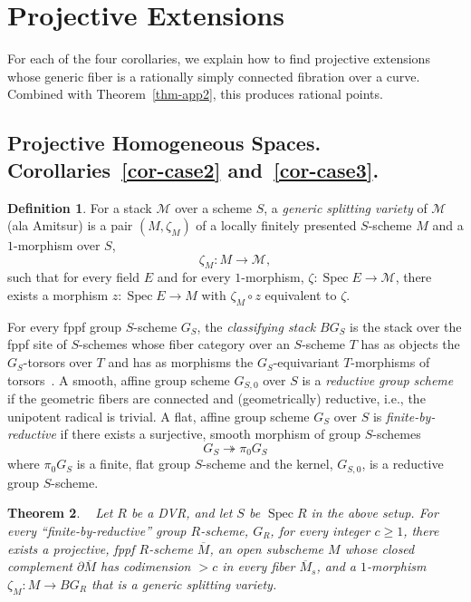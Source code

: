 \documentclass[11pt]{article}
\newtheorem{theo}{Theorem}[section]
\theoremstyle{definition}
\newtheorem{defi}[theo]{Definition}
\numberwithin{equation}{section}
\numberwithin{figure}{section}
\numberwithin{table}{section}
\newcommand{\mc}{\mathcal}
\newcommand{\mcM}{\mc{M}}
\newcommand{\ol}{\overline}
\DeclareMathOperator{\SP}{Spec}
\begin{document}
\section{Projective Extensions} \label{sec-extend}

For each of the four corollaries, we explain how to find projective extensions whose generic fiber is a rationally simply connected fibration over a curve. Combined with Theorem~\ref{thm-app2}, this produces rational points.



\subsection{Projective Homogeneous Spaces. Corollaries~\ref{cor-case2} and~\ref{cor-case3}.}\label{subsec-PHS}

\begin{defi} \label{defn-gs}
For a stack $\mcM$ over a scheme $S$, a \emph{generic splitting variety} of $\mc{M}$ (ala Amitsur) is a pair $(M,\zeta_M)$ of a locally finitely presented $S$-scheme $M$ and a $1$-morphism over $S$,
\[
\zeta_M:M\to \mc{M},
\]
such that for every field $E$ and for every $1$-morphism, $\zeta:\SP E \to
\mc{M}$, there exists a morphism $z:\SP E \to M$ with $\zeta_M\circ z$ equivalent to $\zeta$.
\end{defi}

For every fppf group $S$-scheme $G_S$, the \emph{classifying stack} $BG_S$ is the stack over the fppf site of $S$-schemes whose fiber category over an $S$-scheme $T$ has as objects the $G_S$-torsors over $T$ and has as morphisms the $G_S$-equivariant $T$-morphisms of torsors~\cite[Proposition~10.13.1]{LM-B}. A smooth, affine group scheme $G_{S,0}$ over $S$ is a \emph{reductive group scheme} if the geometric fibers are connected and (geometrically) reductive, i.e., the unipotent radical is trivial. A flat, affine group scheme $G_S$ over $S$ is \emph{finite-by-reductive} if there exists a surjective, smooth morphism of group $S$-schemes
\[
G_S \twoheadrightarrow \pi_0 G_S
\]
where $\pi_0 G_S$ is a finite, flat group $S$-scheme and the kernel, $G_{S,0}$, is a reductive group $S$-scheme.

\begin{theo}
\cite{dJS8}~\cite[Section~16]{dJHS} \label{thm-SdJ}
Let $R$ be a DVR, and let $S$ be $\SP R$ in the above setup. For every ``finite-by-reductive'' group $R$-scheme, $G_R$, for every integer $c\geq 1$, there exists a projective, fppf $R$-scheme $\ol{M}$, an open subscheme $M$ whose closed complement $\partial \ol{M}$ has codimension $>c$ in every fiber $\ol{M}_s$, and a $1$-morphism $\zeta_M:M\to BG_R$ that is a generic splitting variety.
\end{theo}
\end{document}
